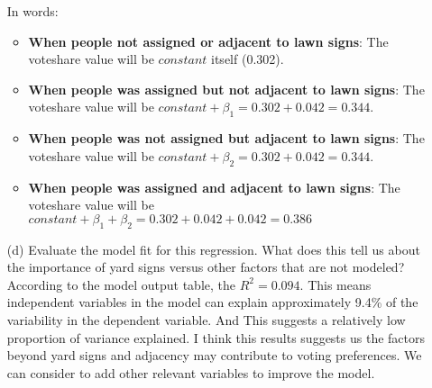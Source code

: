 \documentclass[12pt,letterpaper]{article}
\begin{document}
\begin{enumerate}
	In words:
	\begin{itemize}
	\item \textbf{When people not assigned or adjacent to lawn signs}: The voteshare value will be $constant$ itself (0.302).
	\item \textbf{When people was assigned but not adjacent to lawn signs}: The voteshare value will be $constant + \beta_1 = 0.302 + 0.042 = 0.344$.
	\item \textbf{When people was not assigned but adjacent to lawn signs}: The voteshare value will be $constant + \beta_2 = 0.302 + 0.042 = 0.344$.
	\item \textbf{When people was assigned and adjacent to lawn signs}: The voteshare value will be $constant + \beta_1 + \beta_2 = 0.302 + 0.042 + 0.042 = 0.386$
	\end{itemize}
	
	\vspace{.5cm}
	
	\item [(d)] Evaluate the model fit for this regression.  What does this	tell us about the importance of yard signs versus other factors that are not modeled? \\
	
	According to the model output table, the $R^2 = 0.094$. This means independent variables in the model can explain approximately 9.4\% of the variability in the dependent variable. And This suggests a relatively low proportion of variance explained. I think this results suggests us the factors beyond yard signs and adjacency may contribute to voting preferences. We can consider to add other relevant variables to  improve the model.\\
	
\end{enumerate}  
\end{document}
